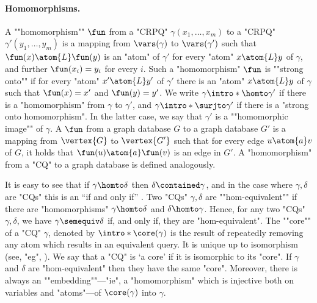 \paragraph{Homomorphisms.}
\AP A ""homomorphism"" $\fun$ from a "CRPQ" $\gamma(x_1, \dotsc, x_m)$ to a "CRPQ" $\gamma'(y_1, \dotsc, y_m)$ is a mapping from $\vars(\gamma)$ to $\vars(\gamma')$ such that $\fun(x) \atom{L} \fun(y)$ is an "atom" of $\gamma'$ for every "atom" $x \atom{L} y$ of $\gamma$, and further $\fun(x_i)=y_i$ for every $i$.
Such a "homomorphism" $\fun$ is \AP""strong onto"" if for every "atom" $x' \atom{L} y'$ of $\gamma'$ there is an "atom" $x \atom{L} y$ of $\gamma$ such that $\fun(x)=x'$ and $\fun(y)=y'$.
We write $\gamma \intro*\homto \gamma'$ if there is a "homomorphism" from $\gamma$ to $\gamma'$, and $\gamma \intro*\surjto \gamma'$ if there is a "strong onto homomorphism".
In the latter case, we say that $\gamma'$ is a \AP""homomorphic image"" of $\gamma$.
A  $\fun$ from a graph database $G$ to a graph database $G'$ is a mapping from $\vertex{G}$ to $\vertex{G'}$ such that  for every edge $u \atom{a} v$ of $G$, it holds that $\fun(u) \atom{a} \fun(v)$ is an edge in $G'$. A "homomorphism" from a "CQ" to a graph database is defined analogously.  

\AP It is easy to see that if $\gamma \homto \delta$ then $\delta \contained \gamma$, and in the case where $\gamma,\delta$ are "CQs" this is an ``if and only if'' \cite[Lemma 13]{DBLP:conf/stoc/ChandraM77}. 
\AP Two "CQs" $\gamma,\delta$ are ""hom-equivalent"" if there are "homomorphisms" $\gamma \homto \delta$ and $\delta \homto \gamma$.
Hence, for any two "CQs" $\gamma, \delta$, we have $\gamma \semequiv \delta$ if, and only if, they are "hom-equivalent".
\AP The ""core"" of a "CQ" $\gamma$, denoted by $\intro*\core(\gamma)$
is the result of repeatedly removing any atom which results in an equivalent query. It is unique up to isomorphism (see, "eg", \cite{DBLP:conf/stoc/ChandraM77}). We say that a "CQ" is `a core' if it is isomorphic to its "core". If $\gamma$ and $\delta$ are "hom-equivalent" then they have
the same "core". Moreover, there is always an \AP""embedding""---"ie", a "homomorphism" which is injective both on variables and "atoms"---of $\core(\gamma)$ into $\gamma$.

